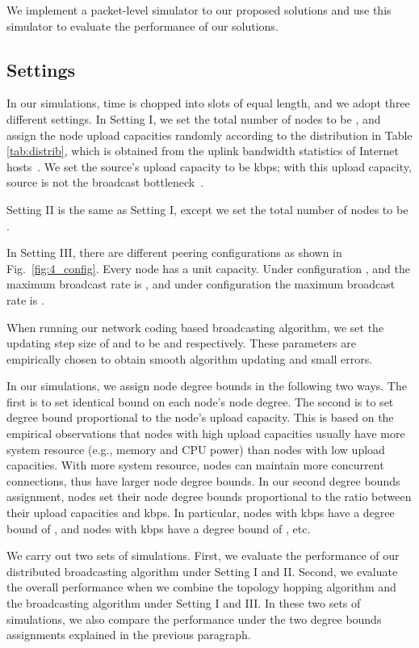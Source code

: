 \documentclass[10pt,conference]{IEEEtran}
\begin{document}
\label{sec:simu}

We implement a packet-level simulator to our proposed solutions and use this simulator to evaluate the performance of our solutions.


\subsection{Settings}

In our simulations, time is chopped into slots of equal length, and we adopt three different settings. In Setting I, we set the total number of nodes to be , and assign the node upload capacities randomly according to the distribution
in Table \ref{tab:distrib}, which is obtained from the uplink bandwidth statistics of Internet hosts~\cite{vodprofitable}. We set the source's upload capacity to be  kbps; with this upload capacity, source is not the broadcast bottleneck~\cite{all:Mutualcast:LPZ05,all:P2PStreaming:KLR.07}.

Setting II is the same as Setting I, except we set the total number of nodes to be .

In Setting III, there are  different peering configurations as shown in Fig.~\ref{fig:4_config}. Every node has a unit capacity. Under configuration ,  and  the maximum broadcast rate is , and under configuration  the maximum broadcast rate is .

When running our network coding based broadcasting algorithm, we set the updating step size of  and  to be  and  respectively. These parameters are empirically chosen to obtain smooth algorithm updating and small errors.

In our simulations, we assign node degree bounds in the following two ways. The first is to set identical bound on each node's node degree. The second is to set degree bound proportional to the node's upload capacity. This is based on the empirical observations that nodes with high upload capacities usually have more system resource (e.g., memory and CPU power) than nodes with low upload capacities. With more system resource, nodes can maintain more concurrent connections, thus have larger node degree bounds. In our second degree bounds assignment, nodes set their node degree bounds proportional to the ratio between their upload capacities and  kbps. In particular, nodes with  kbps have a degree bound of , and nodes with  kbps have a degree bound of , etc.

We carry out two sets of simulations. First, we evaluate the performance of our distributed broadcasting algorithm under Setting I and II. Second, we evaluate the overall performance when we combine the topology hopping algorithm and the broadcasting algorithm under Setting I and III. In these two sets of simulations, we also compare the performance under the two degree bounds assignments explained in the previous paragraph.
\end{document}
